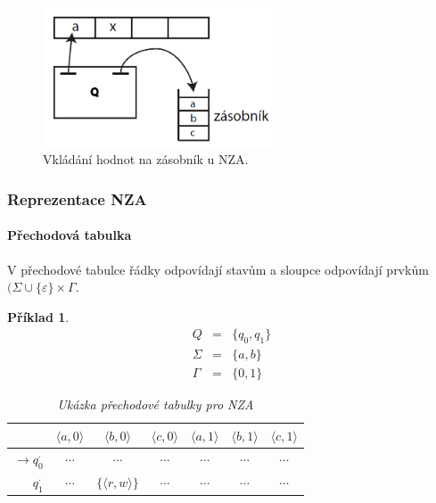 \documentclass[10pt,a4paper]{article}
\theoremstyle{note}
\newtheorem{priklad}{Příklad}
\begin{document}
\begin{figure}[ht]
\centering\includegraphics[width=7cm]{img/ZA2.png}
\caption{Vkládání hodnot na zásobník u NZA.}
\end{figure}

\subsubsection{Reprezentace NZA}

\paragraph{Přechodová tabulka}
V přechodové tabulce řádky odpovídají stavům a sloupce odpovídají prvkům $(\Sigma \cup \lbrace \varepsilon \rbrace \times \Gamma$.
\begin{priklad}
\begin{eqnarray*}
Q &=& \lbrace q_0, q_1 \rbrace \\
\Sigma &=& \lbrace a, b \rbrace \\
\Gamma &=& \lbrace 0, 1 \rbrace
\end{eqnarray*}
\begin{table}[h]
\begin{center}
\begin{tabular}{ r || c | c | c | c | c | c}                   
 & $\langle a, 0 \rangle$ & $\langle b, 0 \rangle$ & $\langle c, 0 \rangle$ & $\langle a, 1 \rangle$ & $\langle b, 1 \rangle$ & $\langle c, 1 \rangle$ \\
\hline
$\rightarrow q_0^{\cdot}$ & $\cdots$ & $\cdots$ & $\cdots$ & $\cdots$ & $\cdots$ & $\cdots$ \\
$q_1^{\cdot}$ & $\cdots$ & $\lbrace \langle r, w \rangle \rbrace$ & $\cdots$ & $\cdots$ & $\cdots$ & $\cdots$
\end{tabular}
\end{center}
\caption{Ukázka přechodové tabulky pro NZA}
\end{table}
\end{priklad}
\end{document}
